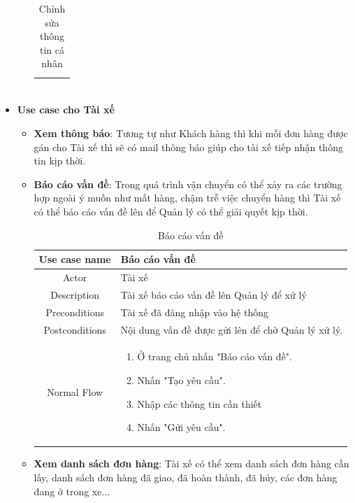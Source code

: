 \begin{itemize}
\begin{itemize}
\begin{table}[H]
\begin{tabular}{|c|m{25em}|}
\begin{enumerate}
						\end{enumerate}
						\\
						\hline
					\end{tabular}
					\caption{Chỉnh sửa thông tin cá nhân}
				\end{table}
			
		\end{itemize}
	
	
	\item \textbf{Use case cho Tài xế}
	
	\begin{itemize}
		\item \textbf{Xem thông báo}: Tương tự như Khách hàng thì khi mỗi đơn hàng được gán cho Tài xế thì sẽ có mail thông báo giúp cho tài xế tiếp nhận thông tin kịp thời.
		
		\item \textbf{Báo cáo vấn đề}: Trong quá trình vận chuyển có thể xảy ra các trường hợp ngoài ý muốn như mất hàng, chậm trễ việc chuyển hàng thì Tài xế có thể báo cáo vấn đề lên để Quản lý có thể giải quyết kịp thời.
		
		\begin{table}[H]
			\centering\begin{tabular}{|c|m{25em}|}
				\hline 
				Use case name & Báo cáo vấn đề\\ 
				\hline 
				Actor & Tài xế \\ 
				\hline
				Description & Tài xế báo cáo vấn đề lên Quản lý để xử lý \\
				\hline 
				Preconditions & Tài xế đã đăng nhập vào hệ thống \\
				\hline
				Postconditions & Nội dung vấn đề được gửi lên để chờ Quản lý xử lý. \\
				\hline
				Normal Flow & \begin{enumerate}
					\item Ở trang chủ nhấn "Báo cáo vấn đề".
					\item Nhấn "Tạo yêu cầu".
					\item Nhập các thông tin cần thiết
					\item Nhấn "Gửi yêu cầu".
					
				\end{enumerate}
				\\
				\hline
			\end{tabular}
			\caption{Báo cáo vấn đề}
		\end{table}
		
		\item \textbf{Xem danh sách đơn hàng}: Tài xế có thể xem danh sách đơn hàng cần lấy, danh sách đơn hàng đã giao, đã hoàn thành, đã hủy, các đơn hàng đang ở trong xe...
		

\end{itemize}
\end{itemize}
